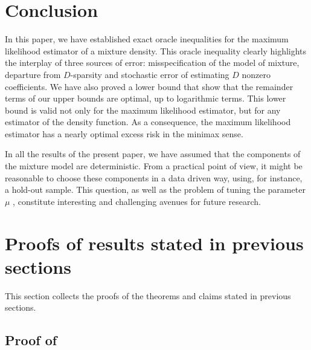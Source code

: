 \section{Conclusion} %
\label{sec:conclusion}

In this paper, we have established exact oracle inequalities for the maximum likelihood 
estimator of a mixture density. This oracle inequality clearly highlights the interplay
of three sources of error: misspecification of the model of mixture, departure from 
$D$-sparsity and stochastic error of estimating $D$ nonzero coefficients.  We have also
proved a lower bound that show that the remainder terms of our upper bounds are optimal, 
up to logarithmic terms. This lower bound is valid not only for the maximum likelihood
estimator, but for any estimator of the density function. As a consequence, the maximum
likelihood estimator has a nearly optimal excess risk in the minimax sense. 

In all the results of the present paper, we have assumed that the components of the mixture 
model are deterministic. From a practical point of view, it might be reasonable to choose
these components in a data driven way, using, for instance, a hold-out sample. This question,
as well as the problem of tuning the parameter $\mu$ , constitute interesting and challenging
avenues for  future research.




\section{Proofs of results stated in previous sections} %
\label{sec:proofs}

This section collects the proofs of the theorems and claims stated in previous sections.

\subsection{Proof of }

